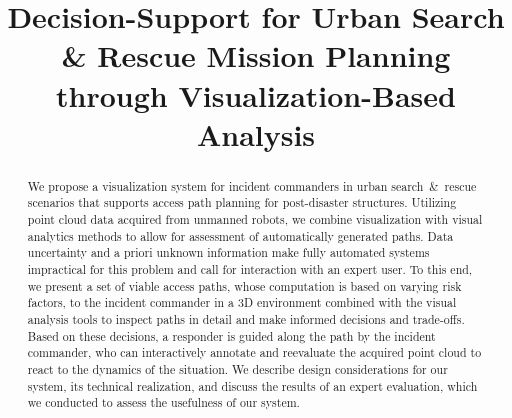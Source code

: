 \documentclass[conference,10pt,letter]{IEEEtran}
\begin{document}
\title{Decision-Support for Urban Search \& Rescue Mission Planning\\ through Visualization-Based Analysis}

\author{
    \and
    \and
    \and
}


\maketitle


\begin{abstract}
We propose a visualization system for incident commanders in urban search~\&~rescue scenarios that supports access path planning for post-disaster structures. Utilizing point cloud data acquired from unmanned robots, we combine visualization with visual analytics methods to allow for assessment of automatically generated paths. Data uncertainty and a priori unknown information make fully automated systems impractical for this problem and call for interaction with an expert user. To this end, we present a set of viable access paths, whose computation is based on varying risk factors, to the incident commander in a 3D environment combined with the visual analysis tools to inspect paths in detail and make informed decisions and trade-offs. Based on these decisions, a responder is guided along the path by the incident commander, who can interactively annotate and reevaluate the acquired point cloud to react to the dynamics of the situation. We describe design considerations for our system, its technical realization, and discuss the results of an expert evaluation, which we conducted to assess the usefulness of our system.
\end{abstract}
\end{document}
